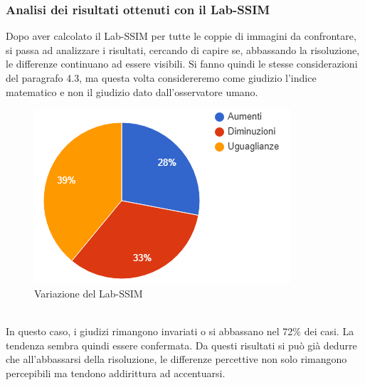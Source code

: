 \documentclass[a4paper,11pt]{article}
\begin{document}
    \subsubsection{Analisi dei risultati ottenuti con il Lab-SSIM}
    Dopo aver calcolato il Lab-SSIM per tutte le coppie di immagini da confrontare, si passa ad analizzare i risultati, cercando di capire
    se, abbassando la risoluzione, le differenze continuano ad essere visibili. Si fanno quindi le stesse considerazioni del paragrafo 4.3, ma questa volta
    considereremo come giudizio l'indice matematico e non il giudizio dato dall'osservatore umano.
    \begin{figure}[h]
        \centering
        \includegraphics{chart2}
        \caption{Variazione del Lab-SSIM}
    \end{figure}
    \\In questo caso, i giudizi rimangono invariati o si abbassano nel 72\% dei casi. La tendenza sembra quindi essere confermata.    Da questi risultati si può già dedurre che all'abbassarsi della risoluzione, le differenze percettive non solo rimangono percepibili ma tendono addirittura ad accentuarsi.
    \newpage
\end{document}
